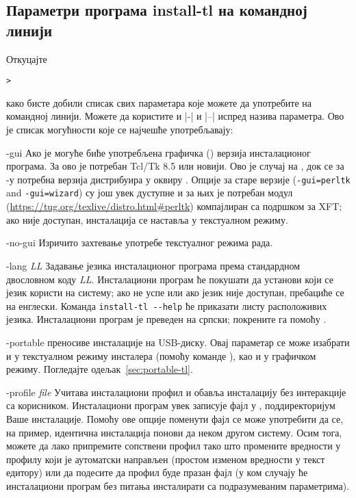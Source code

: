 \documentclass{article}
\begin{document}
\subsection{Параметри програма install-tl на командној линији}
\label{sec:cmdline}

Откуцајте
\begin{alltt}> 
\end{alltt}
како бисте добили списак свих параметара које можете да употребите на
командној линији. Можете да користите и |-| и |--| испред назива
параметра. Ово је списак могућности које се најчешће употребљавају:

\begin{ttdescription}
\item[-gui] Ако је могуће биће употребљена графичка (\GUI{}) верзија
  инсталационог програма. За ово је потребан Tcl/Tk 8.5 или новији.
  Ово је случај на \MacOSX, док се за \Windows{}-у потребна верзија
  дистрибуира у оквиру \TL{}. Опције за старе верзије 
  (\texttt{-gui=perltk} and \texttt{-gui=wizard}) су још увек
  дуступне и за њих је потребан модул 
  (\url{https://tug.org/texlive/distro.html#perltk}) компајлиран са
  подршком за XFT; ако  није доступан, инсталација се
  наставља у текстуалном режиму.

\item[-no-gui] Изричито захтевање употребе текстуалног режима рада.

\item[-lang {\sl LL}] Задавање језика инсталационог програма према
  стандардном двословном коду \textsl{LL}. Инсталациони програм ће
  покушати да установи који се језик користи на систему; ако не успе
  или ако језик није доступан, пребациће се на енглески. Команда
  \verb+install-tl --help+ ће приказати листу расположивих језика.
  Инсталациони програм је преведен на српски; покрените га помоћу
  .

\item[-portable]  преносиве инсталације на
  USB-диску. Овај параметар се може изабрати и у текстуалном
  режиму инсталера (помоћу команде ), као и у графичком режиму.
  Погледајте одељак~\ref{sec:portable-tl}.

\item[-profile {\sl file}] Учитава инсталациони профил  и
  обавља инсталацију без интеракције са корисником. Инсталациони
  програм увек записује фајл  у
  , поддиректоријум Ваше инсталације. Помоћу ове опције
  поменути фајл се може употребити да се, на пример, идентична
  инсталација понови да неком другом систему. Осим тога, можете да лако
  припремите сопствени профил тако што промените вредности у профилу
  који је аутоматски направљен (простом изменом вредности у текст
  едитору) или да подесите да профил буде празан фајл (у ком случају ће
  инсталациони програм без питања инсталирати \TL{} са подразумеваним
  параметрима).


\end{ttdescription}
\end{document}
